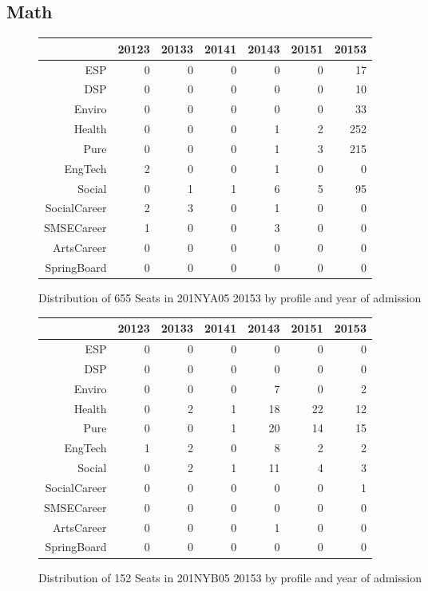 \documentclass{article}\usepackage[]{graphicx}\usepackage[]{color}
\begin{document}
\subsection{Math}
\begin{figure}[H]
\centering
\begin{tabular}{rrrrrrr}
  \hline
 & 20123 & 20133 & 20141 & 20143 & 20151 & 20153 \\ 
  \hline
ESP &   0 &   0 &   0 &   0 &   0 &  17 \\ 
  DSP &   0 &   0 &   0 &   0 &   0 &  10 \\ 
  Enviro &   0 &   0 &   0 &   0 &   0 &  33 \\ 
  Health &   0 &   0 &   0 &   1 &   2 & 252 \\ 
  Pure &   0 &   0 &   0 &   1 &   3 & 215 \\ 
  EngTech &   2 &   0 &   0 &   1 &   0 &   0 \\ 
  Social &   0 &   1 &   1 &   6 &   5 &  95 \\ 
  SocialCareer &   2 &   3 &   0 &   1 &   0 &   0 \\ 
  SMSECareer &   1 &   0 &   0 &   3 &   0 &   0 \\ 
  ArtsCareer &   0 &   0 &   0 &   0 &   0 &   0 \\ 
  SpringBoard &   0 &   0 &   0 &   0 &   0 &   0 \\ 
   \hline
\end{tabular}
\caption{Distribution of 655 Seats in 201NYA05 20153 by profile and year of admission} 
\end{figure}
\begin{figure}[H]
\centering
\begin{tabular}{rrrrrrr}
  \hline
 & 20123 & 20133 & 20141 & 20143 & 20151 & 20153 \\ 
  \hline
ESP &   0 &   0 &   0 &   0 &   0 &   0 \\ 
  DSP &   0 &   0 &   0 &   0 &   0 &   0 \\ 
  Enviro &   0 &   0 &   0 &   7 &   0 &   2 \\ 
  Health &   0 &   2 &   1 &  18 &  22 &  12 \\ 
  Pure &   0 &   0 &   1 &  20 &  14 &  15 \\ 
  EngTech &   1 &   2 &   0 &   8 &   2 &   2 \\ 
  Social &   0 &   2 &   1 &  11 &   4 &   3 \\ 
  SocialCareer &   0 &   0 &   0 &   0 &   0 &   1 \\ 
  SMSECareer &   0 &   0 &   0 &   0 &   0 &   0 \\ 
  ArtsCareer &   0 &   0 &   0 &   1 &   0 &   0 \\ 
  SpringBoard &   0 &   0 &   0 &   0 &   0 &   0 \\ 
   \hline
\end{tabular}
\caption{Distribution of 152 Seats in 201NYB05 20153 by profile and year of admission} 
\end{figure}
\end{document}
